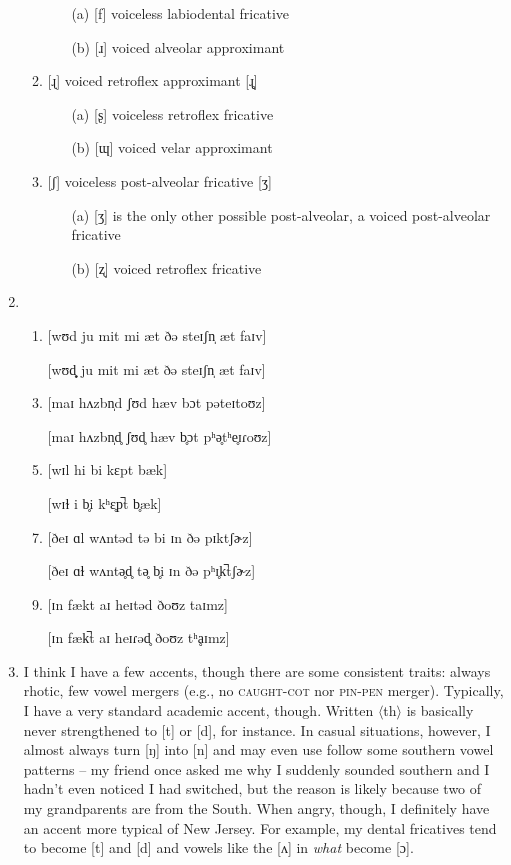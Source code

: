 \documentclass{article}
\begin{document}
\begin{enumerate}
\begin{enumerate}
            \begin{enumerate}
              \item[(a)] {[}f] voiceless labiodental fricative
              \item[(b)] {[}ɹ] voiced alveolar approximant
            \end{enumerate}
            \item {[}ɻ] voiced retroflex approximant [ɻ̥]
            \begin{enumerate}
              \item[(a)] {[}ʂ] voiceless retroflex fricative
              \item[(b)] {[}ɰ] voiced velar approximant
            \end{enumerate}
            \item {[}ʃ] voiceless post-alveolar fricative [ʒ]
            \begin{enumerate}
              \item[(a)] {[}ʒ] is the only other possible post-alveolar, a voiced post-alveolar fricative
              \item[(b)] {[}ʐ] voiced retroflex fricative
            \end{enumerate}
          \end{enumerate}
    \item \begin{enumerate}
            \item {[}wʊd ju mit mi æt ðə steɪʃn̩ æt faɪv]
            \item[] [wʊd̥̟ ju mit mi æt ðə steɪʃn̩ æt faɪv]
            \item {[}maɪ hʌzbn̩d ʃʊd hæv bɔt pəteɪtoʊz]
            \item[] [maɪ hʌzbn̩d̥ ʃʊd̥ hæv b̥ɔt pʰə̥tʰe̥ɪɾoʊz]
            \item {[}wɪl hi bi kɛpt bæk]
            \item[] [wɪɫ i b̥i kʰɛ̥p̚t b̥æk]
            \item {[}ðeɪ ɑl wʌntəd tə bi ɪn ðə pɪktʃɚz]
            \item[] [ðeɪ ɑɫ wʌntə̥d̥ tə̥ b̥i ɪn ðə pʰɪ̥k̚tʃɚz]
            \item {[}ɪn fækt aɪ heɪtəd ðoʊz taɪmz]
            \item[] [ɪn fæk̚t aɪ heɪɾəd̥ ðoʊz tʰḁɪmz]
          \end{enumerate}
    \item I think I have a few accents, though there are some consistent traits: always rhotic, few vowel mergers (e.g., no \textsc{caught}-\textsc{cot} nor \textsc{pin}-\textsc{pen} merger). Typically, I have a very standard academic accent, though. Written $\langle$th$\rangle$ is basically never strengthened to [t] or [d], for instance. In casual situations, however, I almost always turn [ŋ] into [n] and may even use follow some southern vowel patterns -- my friend once asked me why I suddenly sounded southern and I hadn't even noticed I had switched, but the reason is likely because two of my grandparents are from the South. When angry, though, I definitely have an accent more typical of New Jersey. For example, my dental fricatives tend to become [t] and [d] and vowels like the [ʌ] in \textit{what} become [ɔ].

\end{enumerate}
\end{document}
